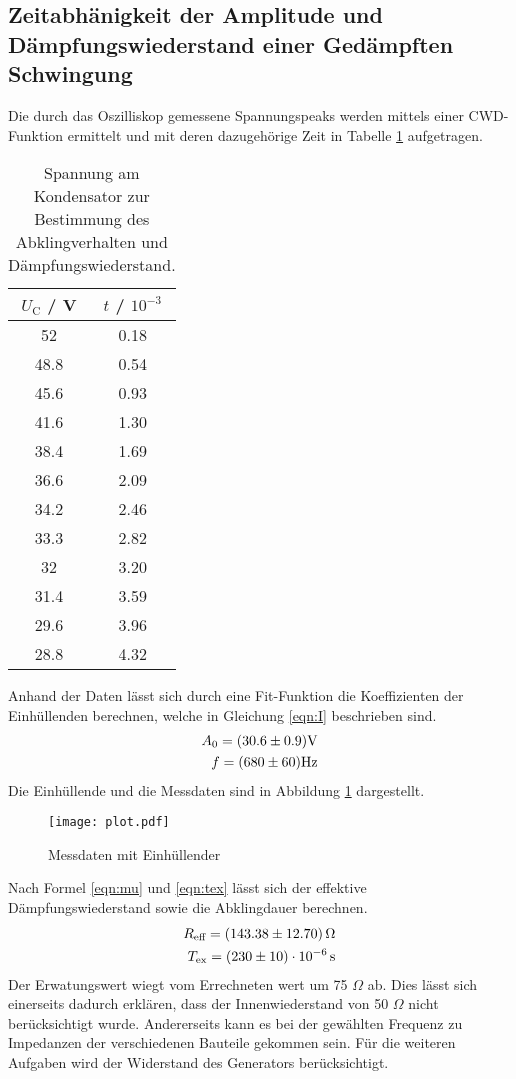 \subsection{Zeitabhänigkeit der Amplitude und Dämpfungswiederstand einer Gedämpften Schwingung}
Die durch das Oszilliskop gemessene Spannungspeaks werden mittels einer CWD-Funktion ermittelt und mit deren dazugehörige Zeit in Tabelle \ref{tab:U_C} aufgetragen.
\begin{table}
  \centering
  \begin{tabular}{c c}
    \toprule
    	$U_\text{C}$ / V & $t$ / $10^{-3}$ \\
    \midrule
	52	& 0.18	\\
	48.8	& 0.54	\\
	45.6	& 0.93 	\\
	41.6	& 1.30	\\
	38.4	& 1.69	\\
	36.6	& 2.09 	\\
	34.2	& 2.46	\\
	33.3 	& 2.82	\\
	32	& 3.20 	\\
	31.4	& 3.59	\\
	29.6	& 3.96	\\
	28.8	& 4.32 	\\
    \bottomrule
  \end{tabular}
  \caption{Spannung am Kondensator zur Bestimmung des Abklingverhalten und Dämpfungswiederstand.}
  \label{tab:U_C}
\end{table}
Anhand der Daten lässt sich durch eine Fit-Funktion die Koeffizienten der Einhüllenden berechnen, welche in Gleichung \ref{eqn:I} beschrieben sind. 
\begin{eqnarray}
  A_0 = ( \num{30.6 +- 0.9} ) \text{V} \\
  f = ( \num{680 +- 60} ) \text{Hz}
  \label{eqn:Koef}
\end{eqnarray}
Die Einhüllende und die Messdaten sind in Abbildung \ref{fig:Osz} dargestellt.
\begin{figure}
  \centering
  \texttt{[image: plot.pdf]}
  \caption{Messdaten mit Einhüllender}
  \label{fig:Osz}
\end{figure}
Nach Formel \ref{eqn:mu} und \ref{eqn:tex} lässt sich der effektive Dämpfungswiederstand sowie die Abklingdauer berechnen.
\begin{eqnarray}
  R_\text{eff} = ( \num{143.38 +- 12.7}) \, \Omega \\
  T_\text{ex} = ( \num{230 +- 10}) \cdot 10^{-6} \, \text{s}
  \label{eqn:Reff}
\end{eqnarray}
Der Erwatungswert wiegt vom Errechneten wert um 75 $\Omega$ ab. Dies lässt sich einerseits dadurch erklären, dass der Innenwiederstand von 50 $\Omega$ nicht berücksichtigt wurde. Andererseits kann es bei der gewählten Frequenz zu Impedanzen der verschiedenen Bauteile gekommen sein. Für die weiteren Aufgaben wird der Widerstand des Generators berücksichtigt.
